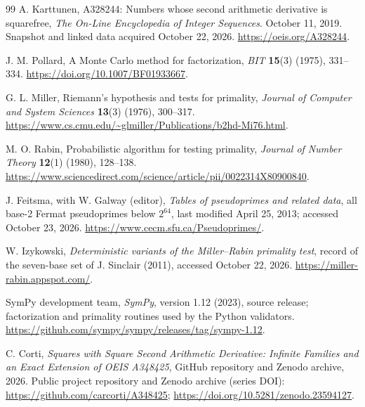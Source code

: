 \documentclass[11pt]{article}
\theoremstyle{definition}
\theoremstyle{remark}
\begin{document}
\begin{thebibliography}{99}
A. Karttunen, A328244: Numbers whose second arithmetic derivative is squarefree,
\textit{The On-Line Encyclopedia of Integer Sequences}.
October 11, 2019.
Snapshot and linked data acquired October 22, 2026.
\url{https://oeis.org/A328244}.

J. M. Pollard, A Monte Carlo method for factorization,
\textit{BIT} \textbf{15}(3) (1975), 331--334.
\url{https://doi.org/10.1007/BF01933667}.

G. L. Miller, Riemann's hypothesis and tests for primality,
\textit{Journal of Computer and System Sciences} \textbf{13}(3)
(1976), 300--317.
\url{https://www.cs.cmu.edu/~glmiller/Publications/b2hd-Mi76.html}.

M. O. Rabin, Probabilistic algorithm for testing primality,
\textit{Journal of Number Theory} \textbf{12}(1) (1980), 128--138.
\url{https://www.sciencedirect.com/science/article/pii/0022314X80900840}.

J. Feitsma, with W. Galway (editor), \textit{Tables of pseudoprimes
and related data}, all base-2 Fermat pseudoprimes below $2^{64}$,
last modified April 25, 2013; accessed October 23, 2026.
\url{https://www.cecm.sfu.ca/Pseudoprimes/}.

W. Izykowski, \textit{Deterministic variants of the Miller--Rabin
primality test}, record of the seven-base set of J. Sinclair (2011),
accessed October 22, 2026.
\url{https://miller-rabin.appspot.com/}.

SymPy development team, \textit{SymPy}, version 1.12 (2023),
source release; factorization and primality routines used by the Python
validators. \url{https://github.com/sympy/sympy/releases/tag/sympy-1.12}.

C. Corti, \textit{Squares with Square Second Arithmetic Derivative:
Infinite Families and an Exact Extension of OEIS A348425},
GitHub repository and Zenodo archive, 2026.
Public project repository and Zenodo archive (series DOI):
\url{https://github.com/carcorti/A348425};
\url{https://doi.org/10.5281/zenodo.23594127}.
\end{thebibliography}
\end{document}
